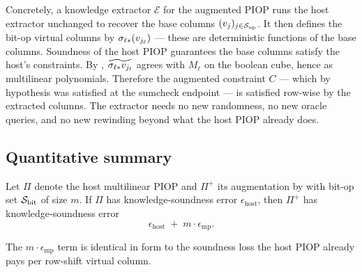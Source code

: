 Concretely, a knowledge extractor $\mathcal{E}$ for the augmented
PIOP runs the host extractor unchanged to recover the base columns
$(v_j)_{j \in \mathcal{S}_{\mathrm{up}}}$. It then defines the bit-op virtual columns by
$\sigma_{\ell *}(v_{j_\ell})$ — these are deterministic functions of
the base columns. Soundness of the host PIOP guarantees the base
columns satisfy the host's constraints. By
, $\widetilde{\sigma_{\ell *} v_{j_\ell}}$ agrees
with $M_{\ell}$ on the boolean cube, hence as multilinear polynomials.
Therefore the augmented constraint $C$ — which by hypothesis was
satisfied at the sumcheck endpoint — is satisfied row-wise by the
extracted columns. The extractor needs no new randomness, no new
oracle queries, and no new rewinding beyond what the host PIOP
already does.

\subsection{Quantitative summary}

\begin{proposition}
\label{prop:soundness}
Let $\Pi$ denote the host multilinear PIOP and $\Pi^+$ its
augmentation by  with bit-op set $\mathcal{S}_{\mathrm{bit}}$ of size $m$.
If $\Pi$ has knowledge-soundness error $\epsilon_{\mathrm{host}}$, then
$\Pi^+$ has knowledge-soundness error
\[
  \epsilon_{\mathrm{host}} \;+\; m \cdot \epsilon_{\mathrm{mp}}.
\]
\end{proposition}

The $m \cdot \epsilon_{\mathrm{mp}}$ term is identical in form to the
soundness loss the host PIOP already pays per row-shift virtual
column.
